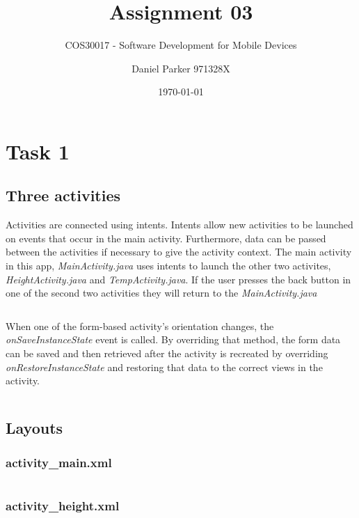 \documentclass[11pt,english,numbers=endperiod,parskip=half]{scrartcl}
\title{Assignment 03}
\subtitle{COS30017 - Software Development for Mobile Devices}
\author{Daniel Parker 971328X}
\date{\today}
\begin{document}
\maketitle
\thispagestyle{empty}

\section{Task 1}
\subsection{Three activities}
\raggedright
Activities are connected using intents. Intents allow new activities to be launched on events that occur in the main activity. Furthermore, data can be passed between the activities if necessary to give the activity context. The main activity in this app, \textit{MainActivity.java} uses intents to launch the other two activites, \textit{HeightActivity.java} and \textit{TempActivity.java}. If the user presses the back button in one of the second two activities they will return to the \textit{MainActivity.java}

\inputminted[firstline=40,lastline=50]{java}{../../Apps/Converters/app/src/main/java/au/net/danielparker/converters/MainActivity.java}

When one of the form-based activity's orientation changes, the \textit{onSaveInstanceState} event is called. By overriding that method, the form data can be saved and then retrieved after the activity is recreated by overriding \textit{onRestoreInstanceState} and restoring that data to the correct views in the activity.

\inputminted[firstline=37,lastline=58]{java}{../../Apps/Converters/app/src/main/java/au/net/danielparker/converters/HeightActivity.java}

\subsection{Layouts}
\subsubsection{activity\_main.xml}
\inputminted{xml}{../../Apps/Converters/app/src/main/res/layout/activity_main.xml}
\subsubsection{activity\_height.xml}
\inputminted{xml}{../../Apps/Converters/app/src/main/res/layout/activity_height.xml}
\end{document}
